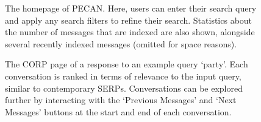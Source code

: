\begin{figure}[t!]
	\caption{The homepage of PECAN. Here, users can enter their search query and apply any search filters to refine their search. Statistics about the number of messages that are indexed are also shown, alongside several recently indexed messages (omitted for space reasons).\vspace{-8pt}}
	\label{fig:homepage}
\end{figure}

\begin{figure}[b!]
	\caption{The CORP page of a response to an example query `party'. Each conversation is ranked in terms of relevance to the input query, similar to contemporary SERPs. Conversations can be explored further by interacting with the `Previous Messages' and `Next Messages' buttons at the start and end of each conversation.\vspace{-8pt}}
	\label{fig:searching}
\end{figure}

